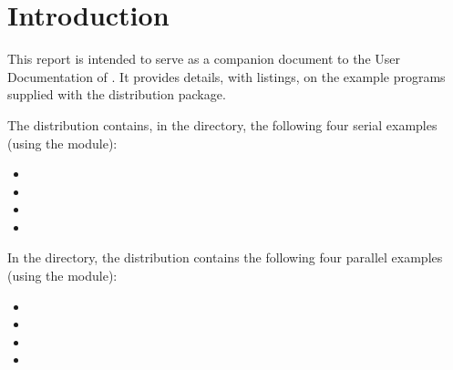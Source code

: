 \section{Introduction}\label{s:ex_intro}

This report is intended to serve as a companion document to the User
Documentation of {\ida} \cite{ida2.2.0_ug}.  It provides details, with
listings, on the example programs supplied with the {\ida} distribution
package.

The {\ida} distribution contains, in the 
directory, the following four serial examples (using the {\nvecs} module):
\begin{itemize}
\item {}
\item {}
\item {}
\item {}
\end{itemize}

In the  directory, the {\ida} 
distribution contains the following four parallel examples 
(using the {\nvecp} module):
\begin{itemize}
\item {}
\item {}
\item {}
\item {}
\end{itemize}


